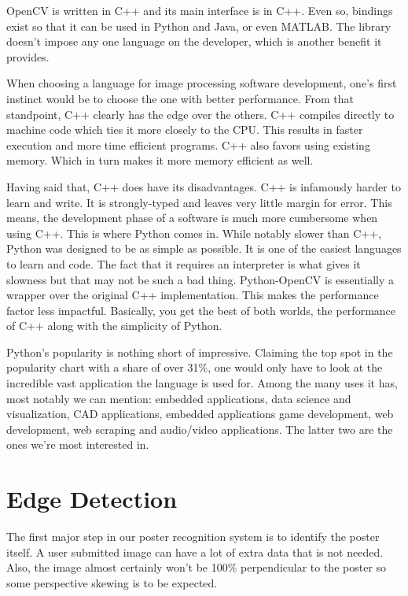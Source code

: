 \documentclass[12pt,a4paper,twoside]{report}
\begin{document}
OpenCV is written in C++ and its main interface is in C++. Even so, bindings exist so that it can be used in Python and Java, or even MATLAB. The library doesn't impose any one language on the developer, which is another benefit it provides. 

When choosing a language for image processing software development, one's first instinct would be to choose the one with better performance. From that standpoint, C++ clearly has the edge over the others. C++ compiles directly to machine code which ties it more closely to the CPU. This results in faster execution and more time efficient programs. C++ also favors using existing memory. Which in turn makes it more memory efficient as well. 

Having said that, C++ does have its disadvantages. C++ is infamously harder to learn and write. It is strongly-typed and leaves very little margin for error. This means, the development phase of a software is much more cumbersome when using C++. This is where Python comes in. While notably slower than C++, Python was designed to be as simple as possible. It is one of the easiest languages to learn and code. The fact that it requires an interpreter is what gives it slowness but that may not be such a bad thing. Python-OpenCV is essentially a wrapper over the original C++ implementation. This makes the performance factor less impactful. Basically, you get the best of both worlds, the performance of C++ along with the simplicity of Python.

Python's popularity is nothing short of impressive. Claiming the top spot in the popularity chart with a share of over 31\%, one would only have to look at the incredible vast application the language is used for. Among the many uses it has, most notably we can mention: embedded applications, data science and visualization, CAD applications, embedded applications game development, web development, web scraping and audio/video applications. The latter two are the ones we're most interested in.


\section{Edge Detection}
The first major step in our poster recognition system is to identify the poster itself. A user submitted image can have a lot of extra data that is not needed. Also, the image almost certainly won't be 100\% perpendicular to the poster so some perspective skewing is to be expected.
\end{document}
